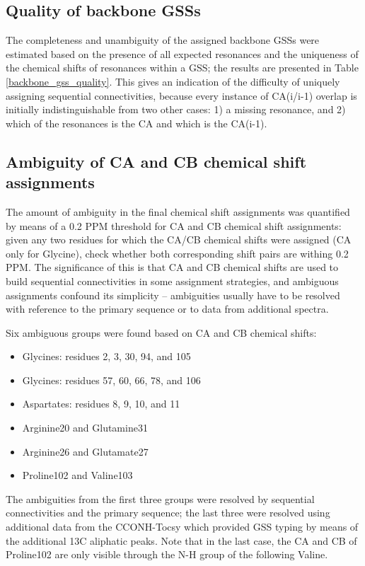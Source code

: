 \subsection*{Quality of backbone GSSs}
The completeness and unambiguity of the assigned backbone GSSs were estimated
based on the presence of all expected resonances and the uniqueness of the
chemical shifts of resonances within a GSS; the results are presented in
Table \ref{backbone_gss_quality}.  This gives an indication of the difficulty
of uniquely assigning sequential connectivities, because every instance of
CA(i/i-1) overlap is initially indistinguishable from two other cases: 1) a 
missing resonance, and 2) which of the resonances is the CA and which is the
CA(i-1).

\subsection*{Ambiguity of CA and CB chemical shift assignments}
The amount of ambiguity in the final chemical shift assignments was
quantified by means of a 0.2 PPM threshold for CA and CB chemical shift 
assignments: given any two residues for which the CA/CB chemical shifts 
were assigned (CA only for Glycine), check whether both corresponding
shift pairs are withing 0.2 PPM.  The significance of this is that CA and CB
chemical shifts are used to build sequential connectivities in some assignment
strategies, and ambiguous assignments confound its simplicity -- ambiguities
usually have to be resolved with reference to the primary sequence or to 
data from additional spectra.

Six ambiguous groups were found based on CA and CB chemical shifts:
\begin{itemize}
  \item Glycines: residues 2, 3, 30, 94, and 105
  \item Glycines: residues 57, 60, 66, 78, and 106
  \item Aspartates: residues 8, 9, 10, and 11
  \item Arginine20 and Glutamine31
  \item Arginine26 and Glutamate27
  \item Proline102 and Valine103
\end{itemize}
The ambiguities from the first three groups were resolved by sequential 
connectivities and the primary sequence; the last three were resolved using
additional data from the CCONH-Tocsy which provided GSS typing by means of 
the additional 13C aliphatic peaks.  Note that in the last case, the CA and
CB of Proline102 are only visible through the N-H group of the following
Valine.


